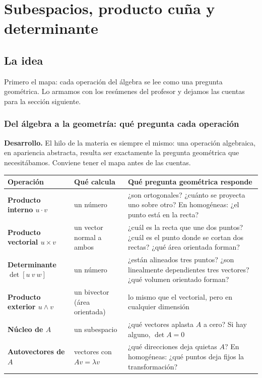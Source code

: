 \chapter{Subespacios, producto cuña y determinante}\label{cap:subespacios}\label{sec:bloque-algebraico}

\section{La idea}


Primero el mapa: cada operación del álgebra se lee como una pregunta geométrica. Lo armamos con los resúmenes del profesor y dejamos las cuentas para la sección siguiente.

\subsection{Del álgebra a la geometría: qué pregunta cada operación}\label{sec:algebra-geometria}

\textbf{Desarrollo.} El hilo de la materia es siempre el mismo: una operación algebraica,
en apariencia abstracta, resulta ser exactamente la pregunta geométrica que necesitábamos.
Conviene tener el mapa antes de las cuentas.

\begin{center}
\begin{tabularx}{\textwidth}{>{\bfseries}p{34mm} X X}
\toprule
Operación & Qué calcula & Qué pregunta geométrica responde\\
\midrule
Producto interno \(u\cdot v\) & un número & ¿son ortogonales? ¿cuánto se proyecta uno
sobre otro? En homogéneas: ¿el punto está en la recta?\\
Producto vectorial \(u\times v\) & un vector normal a ambos & ¿cuál es la recta que une dos
puntos? ¿cuál es el punto donde se cortan dos rectas? ¿qué área orientada forman?\\
Determinante \(\det[u\ v\ w]\) & un número & ¿están alineados tres puntos? ¿son
linealmente dependientes tres vectores? ¿qué volumen orientado forman?\\
Producto exterior \(u\wedge v\) & un bivector (área orientada) & lo mismo que el
vectorial, pero en cualquier dimensión\\
Núcleo de \(A\) & un subespacio & ¿qué vectores aplasta \(A\) a cero? Si hay alguno,
\(\det A=0\)\\
Autovectores de \(A\) & vectores con \(Av=\lambda v\) & ¿qué direcciones deja quietas
\(A\)? En homogéneas: ¿qué puntos deja fijos la transformación?\\
\bottomrule
\end{tabularx}
\end{center}

